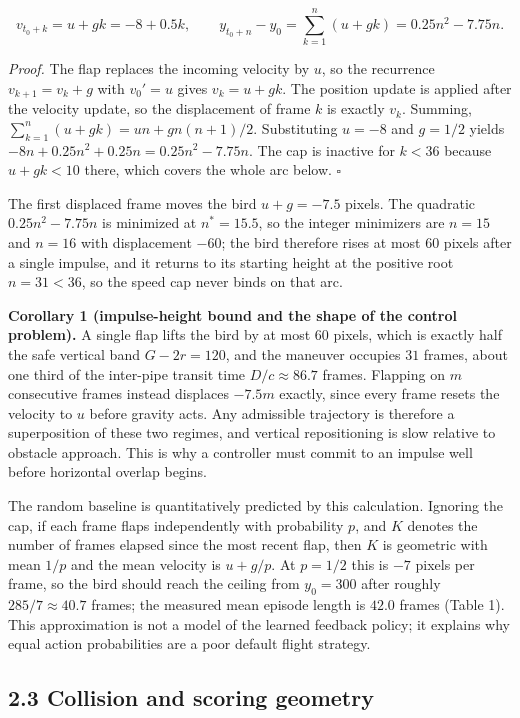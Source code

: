 \documentclass[
  11pt,
]{article}
\begin{document}
\[
v_{t_0+k}=u+gk=-8+0.5k,
\qquad
y_{t_0+n}-y_0=\sum_{k=1}^{n}(u+gk)=0.25n^2-7.75n .
\]

\emph{Proof.} The flap replaces the incoming velocity by \(u\), so the
recurrence \(v_{k+1}=v_k+g\) with \(v_0'=u\) gives \(v_k=u+gk\). The
position update is applied after the velocity update, so the
displacement of frame \(k\) is exactly \(v_k\). Summing,
\(\sum_{k=1}^{n}(u+gk)=un+gn(n+1)/2\). Substituting \(u=-8\) and
\(g=1/2\) yields \(-8n+0.25n^2+0.25n=0.25n^2-7.75n\). The cap is
inactive for \(k<36\) because \(u+gk<10\) there, which covers the whole
arc below. \(\square\)

The first displaced frame moves the bird \(u+g=-7.5\) pixels. The
quadratic \(0.25n^2-7.75n\) is minimized at \(n^{\ast}=15.5\), so the
integer minimizers are \(n=15\) and \(n=16\) with displacement \(-60\);
the bird therefore rises at most 60 pixels after a single impulse, and
it returns to its starting height at the positive root \(n=31<36\), so
the speed cap never binds on that arc.

\textbf{Corollary 1 (impulse-height bound and the shape of the control
problem).} A single flap lifts the bird by at most \(60\) pixels, which
is exactly half the safe vertical band \(G-2r=120\), and the maneuver
occupies \(31\) frames, about one third of the inter-pipe transit time
\(D/c\approx86.7\) frames. Flapping on \(m\) consecutive frames instead
displaces \(-7.5m\) exactly, since every frame resets the velocity to
\(u\) before gravity acts. Any admissible trajectory is therefore a
superposition of these two regimes, and vertical repositioning is slow
relative to obstacle approach. This is why a controller must commit to
an impulse well before horizontal overlap begins.

The random baseline is quantitatively predicted by this calculation.
Ignoring the cap, if each frame flaps independently with probability
\(p\), and \(K\) denotes the number of frames elapsed since the most
recent flap, then \(K\) is geometric with mean \(1/p\) and the mean
velocity is \(u+g/p\). At \(p=1/2\) this is \(-7\) pixels per frame, so
the bird should reach the ceiling from \(y_0=300\) after roughly
\(285/7\approx40.7\) frames; the measured mean episode length is
\(42.0\) frames (Table 1). This approximation is not a model of the
learned feedback policy; it explains why equal action probabilities are
a poor default flight strategy.

\subsection{2.3 Collision and scoring
geometry}\label{collision-and-scoring-geometry}
\end{document}

